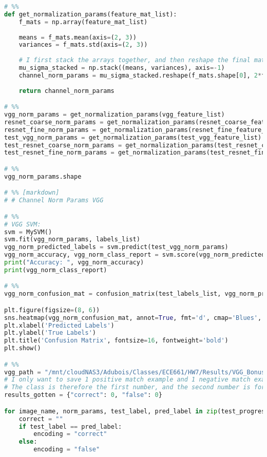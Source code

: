 \documentclass{article}
\begin{document}
\begin{lstlisting}[language=Python]
# %%
def get_normalization_params(feature_mat_list):
    f_mats = np.array(feature_mat_list)
    
    means = f_mats.mean(axis=(2, 3))
    variances = f_mats.std(axis=(2, 3))
    
    # I first stack the arrays together, and then reshape the final matrix to interleave the means and variances
    mu_sigma_stacked = np.stack((means, variances), axis=-1)
    channel_norm_params = mu_sigma_stacked.reshape(f_mats.shape[0], 2*f_mats.shape[1])
    
    return channel_norm_params

# %%
vgg_norm_params = get_normalization_params(vgg_feature_list)
resnet_coarse_norm_params = get_normalization_params(resnet_coarse_feature_list)
resnet_fine_norm_params = get_normalization_params(resnet_fine_feature_list)
test_vgg_norm_params = get_normalization_params(test_vgg_feature_list)
test_resnet_coarse_norm_params = get_normalization_params(test_resnet_coarse_feature_list)
test_resnet_fine_norm_params = get_normalization_params(test_resnet_fine_feature_list)

# %%
vgg_norm_params.shape

# %% [markdown]
# # Channel Norm Params VGG

# %%
# VGG SVM:
svm = MySVM()
svm.fit(vgg_norm_params, labels_list)
vgg_norm_predicted_labels = svm.predict(test_vgg_norm_params)
vgg_norm_accuracy, vgg_norm_class_report = svm.score(vgg_norm_predicted_labels, test_labels_list)
print("Accuracy: ", vgg_norm_accuracy)
print(vgg_norm_class_report)

# %%
vgg_norm_confusion_mat = confusion_matrix(test_labels_list, vgg_norm_predicted_labels)

plt.figure(figsize=(8, 6))
sns.heatmap(vgg_norm_confusion_mat, annot=True, fmt='d', cmap='Blues', cbar=False)
plt.xlabel('Predicted Labels')
plt.ylabel('True Labels')
plt.title('Confusion Matrix', fontsize=16, fontweight='bold')
plt.show()

# %%
vgg_path = "/mnt/cloudNAS3/Adubois/Classes/ECE661/HW7/Results/VGG_Bonus_Results/"
# I only want to save 1 positive match example and 1 negative match example for each class
# The class is therefore the first number, and the second number is for matching labels or not
results_gotten = {"correct": 0, "false": 0}

for image_name, norm_params, test_label, pred_label in zip(test_progress_bar, test_vgg_norm_params, test_labels_list, vgg_norm_predicted_labels):
    correct = ""
    if test_label == pred_label:
        encoding = "correct"
    else:
        encoding = "false"
    

\end{lstlisting}
\end{document}
